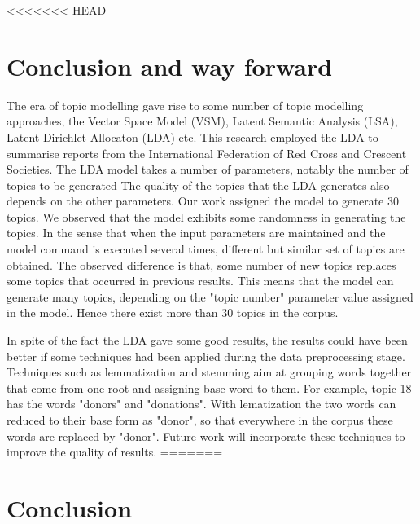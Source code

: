 <<<<<<< HEAD
\chapter{Conclusion and way forward}

The era of topic modelling gave rise to some number of topic modelling approaches, the Vector Space Model (VSM), Latent Semantic Analysis (LSA), Latent Dirichlet Allocaton (LDA) etc. This research employed the LDA to summarise reports from the International Federation of Red Cross and Crescent Societies. The LDA model takes a number of parameters, notably the number of topics to be generated The quality of the topics that the LDA generates also depends on the other parameters. Our work assigned the model to generate 30 topics. We observed that the model exhibits some randomness in generating the topics. In the sense that when the input parameters are maintained and the model command is executed several times, different but similar set of topics are obtained. The observed difference is that, some number of new topics replaces some topics that occurred in previous results. This means that the model can generate  many topics, depending on the "topic number" parameter value assigned in the model. Hence there exist more than 30 topics in the corpus.

In spite of the fact the LDA gave some good results, the results could have been better if some techniques had been applied during the data preprocessing stage. Techniques such as lemmatization and stemming aim at grouping words together that come from one root and assigning base word to them. For example, topic 18 has the words "donors" and "donations". With lematization the two words can reduced to their base form as "donor", so that everywhere in the corpus these words are replaced by "donor".  
Future work will incorporate these techniques to improve the quality of results.
=======
\chapter{Conclusion}


